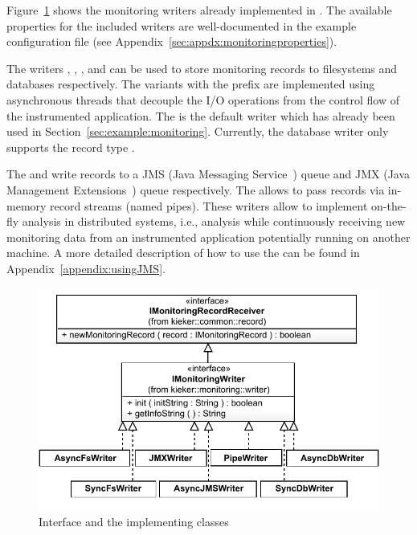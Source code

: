 Figure~\ref{figure:monitoringLogWritersHierarchy} shows the monitoring writers %
already implemented in \KiekerMonitoringPart{}. The available properties for the %
included writers are well-documented in the %
example configuration file (see Appendix~\ref{sec:appdx:monitoringproperties}). %

\enlargethispage{1.2cm}

The writers , %
, , and  can be used %
to store monitoring records to filesystems and databases respectively. %
The variants with the prefix  are implemented using asynchronous %
threads that decouple the I/O operations from the control flow of the %
instrumented application. %
The  is the default writer which has already been used in %
Section~\ref{sec:example:monitoring}. %
Currently, the database writer only supports the record type . %

The  and  write records to a JMS %
(Java Messaging Service~\cite{JMS-WebSite}) queue and JMX (Java Management %
Extensions~\cite{JMX-Website}) queue respectively. The  %
allows to pass records via in-memory record streams (named pipes). %
These writers allow to implement on-the-fly analysis in distributed systems, i.e., analysis while %
continuously receiving new monitoring data from an instrumented application potentially %
running on another machine. A more detailed description of how to use the  %
can be found in Appendix~\ref{appendix:usingJMS}. %

\begin{figure}[H]
\begin{centering}
\includegraphics[scale=0.7]{images/kieker_writerimplsuserguide-modified}
\caption{Interface  and  the implementing classes}
\label{figure:monitoringLogWritersHierarchy}
\end{centering}
\end{figure}

